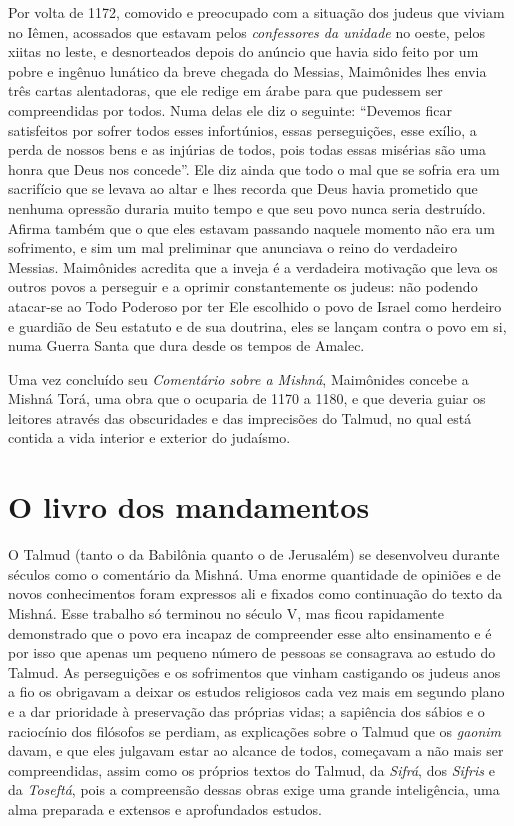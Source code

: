 Por volta de 1172, comovido e preocupado com a situação dos judeus que
viviam no Iêmen, acossados que estavam pelos \emph{confessores da unidade}
no oeste, pelos xiitas no leste, e desnorteados depois do anúncio que
havia sido feito por um pobre e ingênuo lunático da breve chegada do Messias, 
Maimônides lhes envia três cartas alentadoras, que ele
redige em árabe para que pudessem ser compreendidas por todos. Numa
delas ele diz o seguinte: ``Devemos ficar satisfeitos por sofrer todos
esses infortúnios, essas perseguições, esse exílio, a perda de nossos
bens e as injúrias de todos, pois todas essas misérias são uma honra que
Deus nos concede''. Ele diz ainda que todo o mal que se sofria era um
sacrifício que se levava ao altar e lhes recorda que Deus havia
prometido que nenhuma opressão duraria muito tempo e que seu povo nunca
seria destruído. Afirma também que o que eles estavam passando naquele
momento não era um sofrimento, e sim um mal preliminar que anunciava o
reino do verdadeiro Messias. Maimônides acredita que a inveja é a
verdadeira motivação que leva os outros povos a perseguir e a oprimir
constantemente os judeus: não podendo atacar-se ao Todo Poderoso por
ter Ele escolhido o povo de Israel como herdeiro e guardião de Seu
estatuto e de sua doutrina, eles se lançam contra o povo em si, numa
Guerra Santa que dura desde os tempos de Amalec.

Uma vez concluído seu \emph{Comentário sobre a Mishná}, Maimônides
concebe a Mishná Torá, uma obra que o ocuparia de 1170 a 1180, e
que deveria guiar os leitores através das obscuridades e das
imprecisões do Talmud, no qual está contida a vida interior e exterior
do judaísmo.

\section{O livro dos mandamentos}

O Talmud (tanto o da Babilônia quanto o de Jerusalém) se
desenvolveu durante séculos como o comentário da Mishná. Uma
enorme quantidade de opiniões e de novos conhecimentos foram expressos
ali e fixados como continuação do texto da Mishná. Esse trabalho
só terminou no século V, mas ficou rapidamente demonstrado que o povo
era incapaz de compreender esse alto ensinamento e é por isso que apenas
um pequeno número de pessoas se consagrava ao estudo do Talmud.
As perseguições e os sofrimentos que vinham castigando os judeus anos a
fio os obrigavam a deixar os estudos religiosos cada vez mais em segundo
plano e a dar prioridade à preservação das próprias vidas; a sapiência
dos sábios e o raciocínio dos filósofos se perdiam, as explicações sobre
o Talmud que os \emph{gaonim} davam, e que eles julgavam estar ao
alcance de todos, começavam a não mais ser compreendidas, assim como os
próprios textos do Talmud, da \emph{Sifrá}, dos \emph{Sifris} e
da \emph{Toseftá}, pois a compreensão dessas obras exige uma grande
inteligência, uma alma preparada e extensos e aprofundados estudos.

